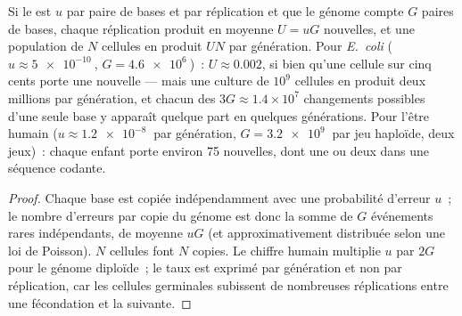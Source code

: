 \begin{theorem}\label{thm:b2:genome-diversification:rate}
Si le  est $u$ par paire de bases et par réplication et
que le génome compte $G$ paires de bases, chaque réplication produit en
moyenne $U = uG$  nouvelles, et une population de $N$ cellules
en produit $UN$ par génération. Pour \emph{E.~coli}
($u \approx \qty{5e-10}{}$, $G =
\qty{4.6e6}{}$)~: $U \approx 0.002$, si bien qu'une cellule sur cinq
cents porte une  nouvelle --- mais une culture de $10^{9}$
cellules en produit deux millions par génération, et chacun des
$3G \approx 1.4\times
10^{7}$ changements possibles d'une seule base y apparaît quelque part
en quelques générations. Pour l'être humain ($u \approx \qty{1.2e-8}{}$
par génération, $G = \qty{3.2e9}{}$ par jeu haploïde, deux jeux)~:
chaque enfant porte environ \num{75}  nouvelles, dont une ou
deux dans une séquence codante.
\end{theorem}
\begin{proof}
Chaque base est copiée indépendamment avec une probabilité d'erreur $u$~;
le nombre d'erreurs par copie du génome est donc la somme de $G$
événements rares indépendants, de moyenne $uG$ (et approximativement
distribuée selon une loi de Poisson). $N$ cellules font $N$ copies. Le
chiffre humain multiplie $u$ par $2G$ pour le génome diploïde~; le taux
est exprimé par génération et non par réplication, car les cellules
germinales subissent de nombreuses réplications entre une fécondation et
la suivante.
\end{proof}

